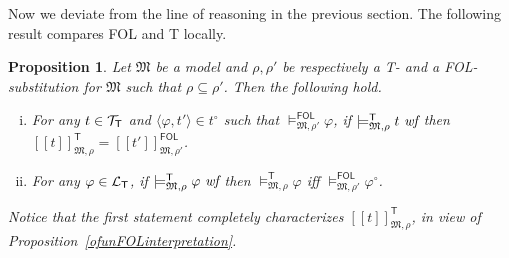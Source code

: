 \documentclass{article}
\newtheorem{proposition}[definition]{Proposition}
\newcommand{\T}{\textsf T}
\newcommand{\FOL}{\textsf{FOL}}
\newcommand{\ofun}[1]{\ensuremath{{#1}^\circ}}
\newcommand{\wf}{\ \mbox{\em wf}}
\newcommand{\pair}[2]{\ensuremath{\langle{#1},{#2}\rangle}}
\newcommand{\lang}[1]{\ensuremath{{\cal L}_{\mathsf{#1}}}}
\newcommand{\terms}[1]{\ensuremath{{\cal T}_{\mathsf{#1}}}}
\newcommand{\ints}[4]{\ensuremath{[\![{#4}]\!]^{\mathsf{#1}}_{\mathfrak{#2},{#3}}}}
\newcommand{\mymodelss}[3]{\ensuremath{\models_{\mathfrak{#2},{#3}}^{\mathsf{#1}}}}
\begin{document}
\bigskip\noindent
Now we deviate from the line of reasoning in the previous section.
The following result compares {\FOL} and {\T} locally.
\begin{proposition}\label{ofunTinterpretation} Let $\mathfrak M$ be a
model and $\rho,\rho'$ be respectively a {\T}- and a {\FOL}-substitution
for $\mathfrak M$ such that $\rho\subseteq\rho'$.  Then the following hold.
\begin{enumerate}[(i)]
\item For any $t\in\terms{T}$ and $\pair\varphi{t'}\in\ofun{t}$ such
that $\mymodelss{FOL}M{\rho'}\varphi$, if $\mymodelss{T}M\rho{t}\wf$
then $\ints{T}M\rho{t}=\ints{FOL}M{\rho'}{t'}$.
\item For any $\varphi\in\lang{T}$, if $\mymodelss{T}M\rho\varphi\wf$
then $\mymodelss{T}M\rho\varphi$ iff $\mymodelss{FOL}M{\rho'}\ofun\varphi$.
\end{enumerate}
Notice that the first statement completely characterizes
$\ints{T}M\rho{t}$, in view of Proposition~\ref{ofunFOLinterpretation}.
\end{proposition}
\end{document}
